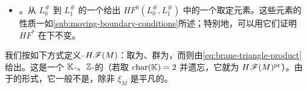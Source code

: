\begin{itemize}
\begin{equation}
\cong H^n\bigl(L;\,|\lambda^{\mathrm{top}}TL|_\KK\bigr)
\cong H_0(L;\KK)\to\KK.
\end{equation}
由它构造的、\trDegree{}为 $-n$ 的\trPairing
\begin{equation*}
HF^*(L_1^{\#},L_0^{\#}\otimes\lambda^{\mathrm{top}}(TL_0))\otimes HF^*(L_0^{\#},L_1^{\#})\to\KK,
\qquad
\langle a_2,a_1\rangle=\int_{L_0^{\#}}a_2a_1
\end{equation*}
\begingroup{}\emergencystretch=3em
是\trNondegenerate{}而且\trGraded{}对称的。\penalty0后一条性质需要稍作解释。\penalty0利用取定的\trIsomorphism{}$\lambda^{\mathrm{top}}(TL_k)\cong\xi_M|_{L_k}$，可以把 $a_2$ 看成 $HF^*(L_1^{\#},L_0^{\#}\otimes\xi_M|_{L_0})$ 中的元素，而把 $a_1$ 看成 $HF^*(L_1^{\#}\otimes\xi_M|_{L_0},L_1^{\#}\otimes\lambda^{\mathrm{top}}(TL_1))$ 中的元素。记住这一点，便有 $a_1a_2\in HF^*(L_1^{\#},L_1^{\#}\otimes\lambda^{\mathrm{top}}(TL_1))$，从而下列方程是有意义的：\par\endgroup
\begin{equation*}
\langle a_1,a_2\rangle=(-1)^{|a_1||a_2|}\langle a_2,a_1\rangle.
\end{equation*}
\item \emph{\trIsotopy\trInvariance}。从 $L_0^{\#}$ 到 $L_1^{\#}$ 的一个\trExactLagrangianBrane{}\trIsotopy{}给出 $HF^0(L_0^{\#},L_1^{\#})$ 中的一个取定元素。这些元素的性质一如\cref{sub:moving-boundary-conditions}所述；特别地，可以用它们证明 $HF^*$ 在\trIsotopy{}下不变。
\end{itemize}
我们按如下方式定义\trDonaldson--\trFukayaCategory{}$H\mathscr{F}(M)$：取\trExactLagrangianBrane{}为\trObject、\trFloerCohomology{}群为\trMorphism，而\trComposition{}则由\eqref{eq:brane-triangle-product} 给出。这是一个 $\mathbb{K}$-\trLinear、$\mathbb{Z}$-\trGraded{}的\trCategory（若取 $\mathrm{char}(\mathbb{K})=2$ 并遗忘\trGrading，它就\trDegenerate{}为 $H\mathscr{F}(M)^{\mathrm{pr}}$）。由于\trPoincareDuality{}\trPairing{}的\trTwisted{}形式，它一般不是\trFrobenius\trCategory，除非 $\xi_M$ 是平凡的。
